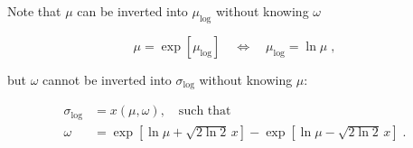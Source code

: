 \documentclass[a4paper,12pt]{article}
\begin{document}
Note that $\mu$ can be inverted into $\mu_\mathrm{log}$ without knowing $\omega$

\begin{equation} \label{eq:mu-log-mu}
\mu = \exp \left[ \mu_\mathrm{log} \right] \quad \Leftrightarrow \quad \mu_\mathrm{log} = \ln \mu \; ,
\end{equation}

but $\omega$ cannot be inverted into $\sigma_\mathrm{log}$ without knowing $\mu$:

\vspace{-0.5em}
\begin{equation} \label{eq:sig-log-fwhm}
\begin{split}
\sigma_\mathrm{log} &= x(\mu, \omega), \quad \text{such that} \\
\omega &= \exp \left[ \ln \mu + \sqrt{2 \ln 2} \, x \right] - \exp \left[ \ln \mu - \sqrt{2 \ln 2} \, x \right] \; .
\end{split}
\end{equation}
\end{document}
